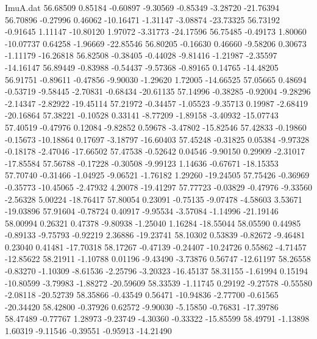 \begin{filecontents}{ImuA.dat}
  56.68509    0.85184   -0.60897   -9.30569   -0.85349   -3.28720  -21.76394
  56.70896   -0.27996    0.46062  -10.16471   -1.31147   -3.08874  -23.73325
  56.73192   -0.91645    1.11147  -10.80120    1.97072   -3.31773  -24.17596
  56.75485   -0.49173    1.80060  -10.07737    0.64258   -1.96669  -22.85546
  56.80205   -0.16630    0.46660   -9.58206    0.30673   -1.11179  -16.26818
  56.82508   -0.38405   -0.44028   -9.81416   -1.21987   -2.35597  -14.16147
  56.89449   -0.83988   -0.54437   -9.57368   -0.89165    0.14765  -14.48205
  56.91751   -0.89611   -0.47856   -9.90030   -1.29620    1.72005  -14.66525
  57.05665    0.48694   -0.53719   -9.58445   -2.70831   -0.68434  -20.61135
  57.14996   -0.38285   -0.92004   -9.28296   -2.14347   -2.82922  -19.45114
  57.21972   -0.34457   -1.05523   -9.35713    0.19987   -2.68419  -20.16864
  57.38221   -0.10528    0.33141   -8.77209   -1.89158   -3.40932  -15.07743
  57.40519   -0.47976    0.12084   -9.82852    0.59678   -3.47802  -15.82546
  57.42833   -0.19860   -0.15673  -10.18864    0.17697   -3.18797  -16.60403
  57.45248   -0.31825    0.05384   -9.97328   -0.18178   -2.47046  -17.66502
  57.47538   -0.52642    0.04546   -9.90150    0.29909   -2.31017  -17.85584
  57.56788   -0.17228   -0.30508   -9.99123    1.14636   -0.67671  -18.15353
  57.70740   -0.31466   -1.04925   -9.06521   -1.76182    1.29260  -19.24505
  57.75426   -0.36969   -0.35773  -10.45065   -2.47932    4.20078  -19.41297
  57.77723   -0.03829   -0.47976   -9.33560   -2.56328    5.00224  -18.76417
  57.80054    0.23091   -0.75135   -9.07478   -4.58603    3.53671  -19.03896
  57.91604   -0.78724    0.40917   -9.95534   -3.57084   -1.14996  -21.19146
  58.00994    0.26321    0.47378   -9.80938   -1.25040    1.16284  -18.55044
  58.05590    0.44985   -0.89133   -9.75793   -0.92219    2.36886  -19.23741
  58.10302    0.53839   -0.82672   -9.46481    0.23040    0.41481  -17.70318
  58.17267   -0.47139   -0.24407  -10.24726    0.55862   -4.71457  -12.85622
  58.21911   -1.10788    0.01196   -9.43490   -3.73876    0.56747  -12.61197
  58.26558   -0.83270   -1.10309   -8.61536   -2.25796   -3.20323  -16.45137
  58.31155   -1.61994    0.15194  -10.80599   -3.79983   -1.88272  -20.59609
  58.33539   -1.11745    0.29192   -9.27578   -0.55580   -2.08118  -20.52739
  58.35866   -0.43549    0.56471  -10.94836   -2.77700   -0.61565  -20.34420
  58.42800   -0.37926    0.62572   -9.90030   -5.15850   -0.76831  -17.39786
  58.47489   -0.77767    1.28973   -9.23749   -4.30360   -0.33322  -15.85599
  58.49791   -1.13898    1.60319   -9.11546   -0.39551   -0.95913  -14.21490

\end{filecontents}
